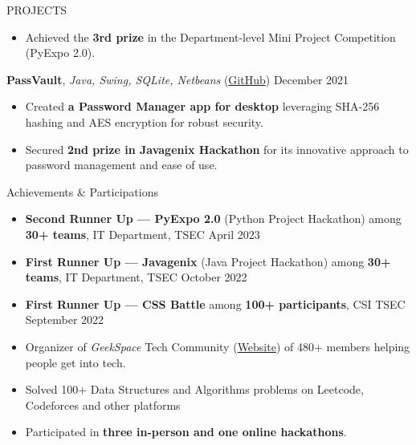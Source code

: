 \documentclass{resume} %
\begin{document}
\begin{rSection}{PROJECTS}
\begin{itemize}
     \item Achieved the \textbf{3rd prize} in the Department-level Mini Project Competition (PyExpo 2.0).
 \end{itemize}
\item \textbf{PassVault}, \textit{Java, Swing, SQLite, Netbeans} (\href{https://github.com/ninadnaik10/PassVault} {GitHub}) \hfill {December 2021} 
\begin{itemize}
    \setlength\itemsep{-0.6em} 
     \item Created \textbf{a Password Manager app for desktop} leveraging SHA-256 hashing and AES encryption for robust security. 
     \item Secured \textbf{2nd prize in Javagenix Hackathon} for its innovative approach to password management and ease of use.
 \end{itemize}

\end{rSection} 

\begin{rSection}{Achievements \& Participations} 
\begin{itemize}
\setlength\itemsep{-0.6em}
    \item \textbf{Second Runner Up — PyExpo 2.0} (Python Project Hackathon) among \textbf{30+ teams}, IT Department, TSEC \hfill {April 2023}
    \item \textbf{First Runner Up — Javagenix} (Java Project Hackathon) among \textbf{30+ teams}, IT Department, TSEC \hfill {October 2022}
    \item \textbf{First Runner Up — CSS Battle} among \textbf{100+ participants}, CSI TSEC \hfill {September 2022}
    \item Organizer of \textit{GeekSpace} Tech Community (\href{https://geekspaceclub.xyz}{Website}) of 480+ members helping people get into tech.
    \item Solved 100+ Data Structures and Algorithms problems on Leetcode, Codeforces and other platforms
    \item Participated in \textbf{three in-person and one online hackathons}.
\end{itemize}

\end{rSection}



\end{document}
